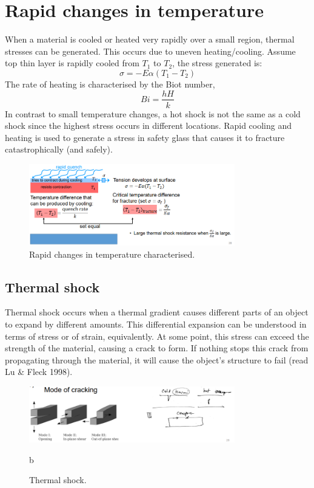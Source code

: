 \section{Rapid changes in temperature}
When a material is cooled or heated very rapidly over a small region, thermal stresses can be generated. This occurs due to uneven heating/cooling. Assume top thin layer is rapidly cooled from $T_1$ to $T_2$, the stress generated is:
\begin{equation}
    \sigma = - E \alpha \left(T_1 - T_2\right)
\end{equation}
The rate of heating is characterised by the Biot number,
\begin{equation}
    Bi = \frac{hH}{k}
\end{equation}
In contrast to small temperature changes, a hot shock is not the same as a cold shock since the highest stress occurs in different locations. Rapid cooling and heating is used to generate a stress in safety glass that causes it to fracture catastrophically (and safely).
\begin{figure}[H]
    \centering
    \includegraphics[width = 0.8\textwidth]{img/figure52.png}
    \caption{Rapid changes in temperature characterised.}
\end{figure}
\subsection{Thermal shock}
Thermal shock occurs when a thermal gradient causes different parts of an object to expand by different amounts. This differential expansion can be understood in terms of stress or of strain, equivalently. At some point, this stress can exceed the strength of the material, causing a crack to form. If nothing stops this crack from propagating through the material, it will cause the object's structure to fail (read Lu \& Fleck 1998).
\begin{figure}[H]
    \centering
    \includegraphics[width = 0.8\textwidth]{img/figure53.png}
    \caption{Thermal shock.}b
\end{figure}
